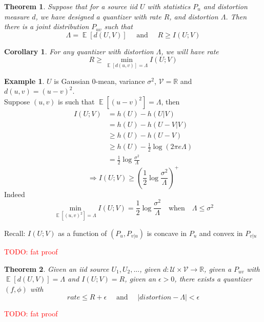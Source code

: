 \documentclass{article}
\newtheorem{theorem}{Theorem}[section]
\newtheorem{corollary}{Corollary}[theorem]
\theoremstyle{definition} %
\newtheorem{example}{Example}
\newcommand{\todo}[1]{\textcolor{red}{TODO: #1}}
\def\V{\mathcal{V}}
\def\U{\mathcal{U}}
\def\R{\mathbb{R}}
\DeclareMathOperator{\E}{\mathbb{E}}%
\begin{document}
\begin{theorem}
  Suppose that for a source iid $U$ with statistics $P_u$ and distortion measure $d$, we have designed a quantizer with rate $R$, and distortion $\Lambda$. Then there is a joint distribution $P_{uv}$ such that
  \[ 
    \Lambda = \E[d(U, V)] \quad \text{ and } \quad R \geq I(U;V)
  \]
\end{theorem}

\begin{corollary}
  For any quantizer with distortion $\Lambda$, we will have rate 
  \[
    R \geq \min_{\E[d(u,v)] = \Lambda} I(U;V)
  \]
\end{corollary}

\begin{example}
  $U$ is Gaussian $0$-mean, variance $\sigma^2$, $\V = \R$ and $d(u,v) = (u-v)^2$.\\
  Suppose $(u,v)$ is such that $\E[(u-v)^2] = \Lambda$, then 
  \begin{align*}
    I(U;V) &= h(U) - h(U|V) \\
           &= h(U) - h(U-V|V) \\
           &\geq h(U) - h(U-V) \\
           &\geq h(U) - \frac{1}{2} \log(2 \pi e \Lambda) \\
           &= \frac{1}{2} \log \frac{\sigma^2}{\Lambda}
  \end{align*}
  \[
    \Rightarrow I(U;V) \geq (\frac{1}{2} \log \frac{\sigma^2}{\Lambda})^+
  \]
  Indeed 
  \[ 
     \min_{\E[(u,v)^2] = \Lambda} I(U;V) = \frac{1}{2} \log \frac{\sigma^2}{\Lambda} \quad \text{when} \quad \Lambda \leq \sigma^2
  \]

  Recall: $I(U;V)$ as a function of $(P_u, P_{v|u})$ is concave in $P_u$ and convex in $P_{v|u}$
\end{example}

\todo{fat proof}

\begin{theorem}
  Given an iid source $U_1, U_2, ...$, given $d: \U \times \V \rightarrow \R$, given a $P_{uv}$ with $\E[d(U,V)] = \Lambda$ and $I(U;V) = R$, given an $\epsilon > 0$, there exists a quantizer $(f, \phi)$ with
  \[
    rate \leq R + \epsilon \quad \text{ and } \quad |distortion - \Lambda| < \epsilon
  \]
\end{theorem}

\todo{fat proof}


\end{document}
